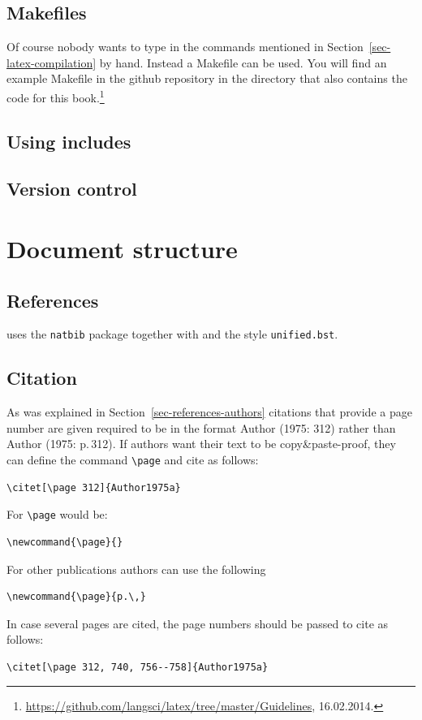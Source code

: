 \subsection{Makefiles}

Of course nobody wants to type in the commands mentioned in Section~\ref{sec-latex-compilation} by
hand. Instead a Makefile can be used. You will find an example Makefile in the
github repository in the directory that also contains the code for this book.\footnote{
  \url{https://github.com/langsci/latex/tree/master/Guidelines}, 16.02.2014.
}


\subsection{Using includes}

\subsection{Version control}


\section{Document structure}




\subsection{References}

\lsp uses the \texttt{natbib} package together with \bibtex{} and the \bibtex style \texttt{unified.bst}.


\subsection{Citation}

As was explained in Section~\ref{sec-references-authors} citations that provide a page number are
given required to be in the format Author (1975: 312) rather than Author (1975: p.\,312). If authors
want their text to be copy\&paste-proof, they can define the command \verb+\page+ and cite as
follows:
\begin{verbatim}
\citet[\page 312]{Author1975a}
\end{verbatim}
For \lsp \verb+\page+ would be:
\begin{verbatim}
\newcommand{\page}{}
\end{verbatim}
For other publications authors can use the following
\begin{verbatim}
\newcommand{\page}{p.\,}
\end{verbatim}
In case several pages are cited, the page numbers should be passed to cite as follows:
\begin{verbatim}
\citet[\page 312, 740, 756--758]{Author1975a}
\end{verbatim}


